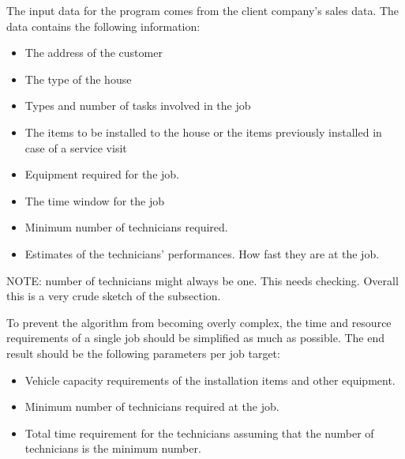 The input data for the program comes from the client company's sales data. The data contains the following information:

\begin{itemize}  
\item The address of the customer
\item The type of the house
\item Types and number of tasks involved in the job 
\item The items to be installed to the house or the items previously installed in case of a service visit
\item Equipment required for the job.
\item The time window for the job
\item Minimum number of technicians required.
\item Estimates of the technicians' performances. How fast they are at the job.
\end{itemize}

NOTE: number of technicians might always be one. This needs checking. Overall this is a very crude sketch of the subsection. 

To prevent the algorithm from becoming overly complex, the time and resource requirements of a single job should be simplified as much as possible. The end result should be the following parameters per job target:

\begin{itemize}
\item Vehicle capacity requirements of the installation items and other equipment.
\item Minimum number of technicians required at the job.
\item Total time requirement for the technicians assuming that the number of technicians is the minimum number.  
\end{itemize}